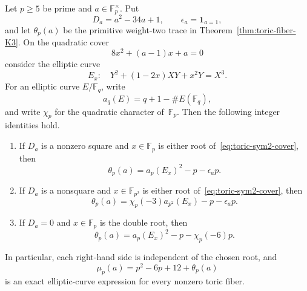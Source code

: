 \begin{theorem}
\label{thm:toric-fiber-sym2}
Let $p\geq5$ be prime and $a\in\mathbb F_p^\times$.  Put
\[
 D_a=a^2-34a+1,
 \qquad \epsilon_a=\mathbf 1_{a=1},
\]
and let $\theta_p(a)$ be the primitive weight-two trace in
Theorem~\ref{thm:toric-fiber-K3}.  On the quadratic cover
\begin{equation}
 8x^2+(a-1)x+a=0
 \label{eq:toric-sym2-cover}
\end{equation}
consider the elliptic curve
\begin{equation}
 E_x:\quad Y^2+(1-2x)XY+x^2Y=X^3.
 \label{eq:toric-sym2-elliptic-curve}
\end{equation}
For an elliptic curve $E/\mathbb F_q$, write
\[
 a_q(E)=q+1-\#E(\mathbb F_q),
\]
and write $\chi_p$ for the quadratic character of~$\mathbb F_p$.
Then the following integer identities hold.

\begin{enumerate}
\item If $D_a$ is a nonzero square and $x\in\mathbb F_p$ is either
root of~\eqref{eq:toric-sym2-cover}, then
\begin{equation}
 \boxed{\theta_p(a)=a_p(E_x)^2-p-\epsilon_a p.}
 \label{eq:toric-sym2-split}
\end{equation}

\item If $D_a$ is a nonsquare and $x\in\mathbb F_{p^2}$ is either
root of~\eqref{eq:toric-sym2-cover}, then
\begin{equation}
 \boxed{\theta_p(a)=
 \chi_p(-3)a_{p^2}(E_x)-p-\epsilon_a p.}
 \label{eq:toric-sym2-inert}
\end{equation}

\item If $D_a=0$ and $x\in\mathbb F_p$ is the double root, then
\begin{equation}
 \boxed{\theta_p(a)=
 a_p(E_x)^2-p-\chi_p(-6)p.}
 \label{eq:toric-sym2-branch}
\end{equation}
\end{enumerate}
In particular, each right-hand side is independent of the chosen root, and
\begin{equation}
 \mu_p(a)=p^2-6p+12+\theta_p(a)
 \label{eq:toric-sym2-mu}
\end{equation}
is an exact elliptic-curve expression for every nonzero toric fiber.
\end{theorem}

